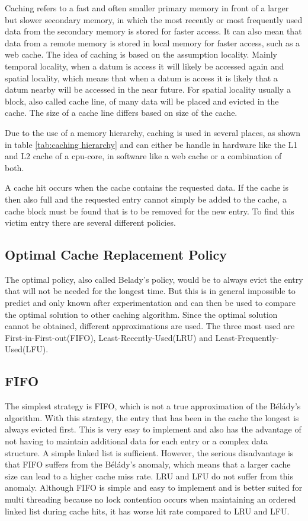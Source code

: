 \documentclass[
	12pt,
	a4paper,
	abstract,
	bibliography=totoc,
	chapterprefix,
	headings=openright,
	numbers=endperiod,
	parskip=half,
	twoside,
]{scrreprt}
\begin{document}

Caching refers to a fast and often smaller primary memory in front of a larger but slower secondary memory, in which the most recently or most frequently used data from the secondary memory is stored for faster access.
It can also mean that data from a remote memory is stored in local memory for faster access, such as a web cache.
The idea of caching is based on the assumption locality.
Mainly temporal locality, when a datum is access it will likely be  accessed again and spatial locality, which means that when a datum is access it is likely that a datum nearby will be accessed in the near future.
For spatial locality usually a block, also called cache line, of many data will be placed and evicted in the cache.
The size of a cache line differs based on size of the cache.

Due to the use of a memory hierarchy, caching is used in several places, as shown in table \ref{tab:caching hierarchy} and can either be handle in hardware like the L1 and L2 cache of a cpu-core, in software like a web cache or a combination of both.

A cache hit occurs when the cache contains the requested data. If the cache is then also full and the requested entry cannot simply be added to the cache, a cache block must be found that is to be removed for the new entry.
To find this victim entry there are several different policies.

\subsection{Optimal Cache Replacement Policy}
The optimal policy, also called Belady's policy, would be to always evict the entry that will not be needed for the longest time.
But this is in general impossible to predict and only known after experimentation and can then be used to compare the optimal solution to other caching algorithm.
Since the optimal solution cannot be obtained, different approximations are used.
The three most used are First-in-First-out(FIFO), Least-Recently-Used(LRU) and Least-Frequently-Used(LFU).

\subsection{FIFO}
The simplest strategy is FIFO, which is not a true approximation of the Bélády's algorithm.
With this strategy, the entry that has been in the cache the longest is always evicted first.
This is very easy to implement and also has the advantage of not having to maintain additional data for each entry or a complex data structure. A simple linked list is sufficient.
However, the serious disadvantage is that FIFO suffers from the Bélády's anomaly, which means that a larger cache size can lead to a higher cache miss rate. LRU and LFU do not suffer from this anomaly.
Although FIFO is simple and easy to implement and is better suited for multi threading because no lock contention occurs when maintaining an ordered linked list during cache hits, it has worse hit rate compared to LRU and LFU.
\end{document}
